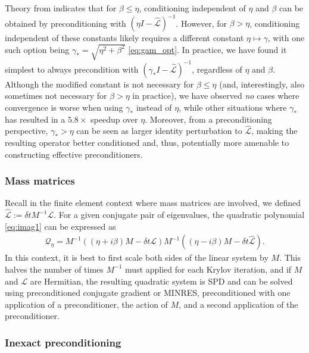 \documentclass[review]{siamart}
\begin{document}
Theory from  indicates that for $\beta\leq \eta$, conditioning
independent of $\eta$ and $\beta$ can be obtained by preconditioning with
$(\eta I - \widehat{\mathcal{L}})^{-1}$. However, for $\beta > \eta$, conditioning
independent of these constants likely requires a different constant $\eta\mapsto\gamma$,
with one such option being $\gamma_* = \sqrt{\eta^2+\beta^2}$ \eqref{eq:gam_opt}.
In practice, we have found it simplest to always precondition with
$(\gamma_* I - \widehat{\mathcal{L}})^{-1}$, regardless of $\eta$ and $\beta$.
Although the modified constant is not necessary for $\beta \leq \eta$ (and,
interestingly, also sometimes not necessary for $\beta > \eta$ in practice),
we have observed \textit{no} cases where convergence is worse when using $\gamma_*$
instead of $\eta$, while other situations where $\gamma_*$ has resulted in a $5.8\times$
speedup over $\eta$. Moreover, from a preconditioning perspective, $\gamma_* > \eta$
can be seen as larger identity perturbation to $\widehat{\mathcal{L}}$, making the
resulting operator better conditioned and, thus, potentially more amenable to
constructing effective preconditioners.

\subsubsection{Mass matrices}

Recall in the finite element context where mass matrices are involved, we defined
$\widehat{\mathcal{L}} := \delta t M^{-1}\mathcal{L}$. For a given conjugate pair
of eigenvalues, the quadratic polynomial \eqref{eq:imag1} can be expressed as
%
\begin{align}\label{eq:scaleM}
\mathcal{Q}_\eta = M^{-1}((\eta + i\beta)M - \delta t{\mathcal{L}})M^{-1}((\eta - i\beta)M -
	\delta t\widehat{\mathcal{L}}).
\end{align}
%
In this context, it is best to first scale both sides of the linear system by $M$.
This halves the number of times $M^{-1}$ must applied for each Krylov iteration,
and if $M$ and $\mathcal{L}$ are Hermitian, the resulting quadratic system is SPD
and can be solved using preconditioned conjugate gradient or MINRES, preconditioned
with one application of a preconditioner, the action of $M$, and a second application
of the preconditioner.

\subsubsection{Inexact preconditioning}
\label{sec:inexact-precond}
\end{document}
